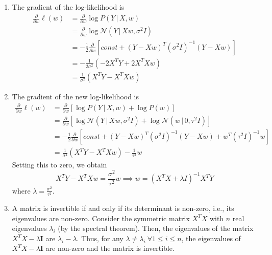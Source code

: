\documentclass[submit]{harvardml}
\newcommand{\given}{\,|\,}
\begin{document}
\begin{enumerate}[label=(\alph*)]
	\item The gradient of the log-likelihood is
	\begin{align*}
	\frac{\partial}{\partial w}\ell(w) &= \frac{\partial}{\partial w} \log P(Y\given X, w) \\
	&= \frac{\partial}{\partial w} \log \mathcal{N}(Y\given Xw, \sigma^2I) \\
	&= - \frac{1}{2} \frac{\partial}{\partial w} \left[
	const + (Y - Xw)^T(\sigma^2 I)^{-1}(Y - Xw)
	\right] \\
	&= - \frac{1}{2\sigma^2} (-2X^TY + 2X^TXw) \\
	&= \frac{1}{\sigma^2} (X^TY - X^TXw)
	\end{align*}
	
	\item The gradient of the new log-likelihood is 
	\begin{align*}
	\frac{\partial}{\partial w}\ell(w) &= \frac{\partial}{\partial w} \left[\log P(Y\given X, w) + \log P(w)\right] \\
	&= \frac{\partial}{\partial w} \left[
	\log\mathcal{N}(Y\given Xw, \sigma^2I) 
	+ \log\mathcal{N}(w\given 0, \tau^2I) 
	\right] \\
	&= - \frac{1}{2} \frac{\partial}{\partial w} \left[
	const 
	+ (Y - Xw)^T(\sigma^2 I)^{-1}(Y - Xw) 
	+ w^T(\tau^2 I)^{-1}w
	\right] \\
	&= \frac{1}{\sigma^2} (X^TY - X^TXw)
	- \frac{1}{\tau^2} w
	\end{align*}
	Setting this to zero, we obtain
	\[
	X^TY - X^TXw = \frac{\sigma^2}{\tau^2} w 
	\implies 
	w = (X^TX + \lambda I)^{-1} X^TY
	\]
	where $\lambda = \frac{\sigma^2}{\tau^2}$.
	
	\item A matrix is invertible if and only if its determinant is non-zero, i.e., its eigenvalues are non-zero. Consider the symmetric matrix $X^TX$ with $n$ real eigenvalues $\lambda_i$ (by the spectral theorem). Then, the eigenvalues of the matrix $X^TX - \lambda\bm{I}$ are $\lambda_i - \lambda$. Thus, for any $\lambda\neq\lambda_i \ \forall 1\leq i\leq n$, the eigenvalues of $X^TX - \lambda\bm{I}$ are non-zero and the matrix is invertible.
	

\end{enumerate}
\end{document}
